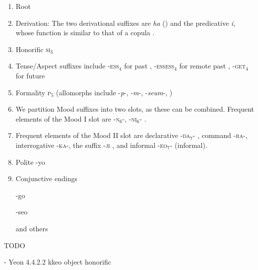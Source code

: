 \documentclass[11pt,letterpaper]{article}
\begin{document}
\begin{enumerate}
    \item Root
    \item Derivation: The two derivational suffixes are \textit{ha} (\citep[4.1.2]{yeon2010korean}) and the predicative \textit{i}, whose function is similar to that of a copula \citep[4.1.4]{yeon2010korean}.
    
    \item Honorific \textsc{si}$_3$ \citep[4.3.2, 4.4.1]{yeon2010korean}
    \item Tense/Aspect suffixes include -\textsc{ess}$_4$ for past \citep[4.5.1.1]{yeon2010korean}, -\textsc{essess}$_4$ for remote past \citep[4.5.1.2]{yeon2010korean}, -\textsc{get}$_4$ for future \citep[4.5.2.1]{yeon2010korean}
    \item Formality \textsc{p}$_5$ (allomorphs include -\textit{p}-, -\textit{m}-, -\textit{seum}-,  \citep[4.3.2]{yeon2010korean})
    \item We partition Mood suffixes into two slots, as these can be combined. Frequent elements of the Mood I slot are -\textsc{n}$_6$-, -\textsc{ni}$_6$- \citep[4.3.2]{yeon2010korean}.
    
    \item Frequent elements of the Mood II slot are declarative -\textsc{da}$_7$- \citep[4.3.2]{yeon2010korean}, command -\textsc{ra}-, interrogative -\textsc{ka}-, the suffix  -\textsc{ji} \citep[4.2.2-3]{yeon2010korean}, and informal -\textsc{eo}$_7$- (informal).
    
    \item Polite -yo
    \item Conjunctive endings
    
    -go
    
    -seo
    
    and others
    
\end{enumerate}

TODO 

- Yeon 4.4.2.2 kkeo object honorific %

\end{document}
